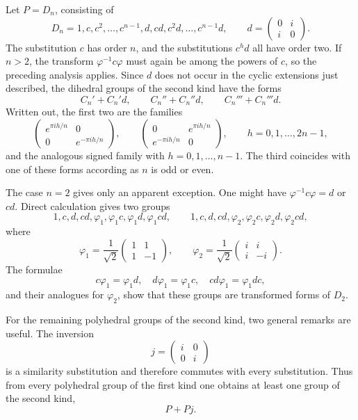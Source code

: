 \documentclass[11pt,a4paper]{book}
\begin{document}
Let \(P=D_n\), consisting of
\begin{equation}\label{eq:62-8d}
 D_n=1,c,c^2,\ldots,c^{n-1},d,cd,c^2d,\ldots,c^{n-1}d,
 \qquad
 d=\begin{pmatrix}0&i\\i&0\end{pmatrix}.
\end{equation}
The substitution \(c\) has order \(n\), and the substitutions \(c^hd\) all have order two.  If \(n>2\), the transform \(\varphi^{-1}c\varphi\) must again be among the powers of \(c\), so the preceding analysis applies.  Since \(d\) does not occur in the cyclic extensions just described, the dihedral groups of the second kind have the forms
\begin{equation}\label{eq:62-9}
 C_n'+C_n'd,
 \qquad
 C_n''+C_n''d,
 \qquad
 C_n'''+C_n'''d.
\end{equation}
Written out, the first two are the families
\[
 \begin{pmatrix}e^{\pi ih/n}&0\\0&e^{-\pi ih/n}\end{pmatrix},
 \qquad
 \begin{pmatrix}0&e^{\pi ih/n}\\e^{-\pi ih/n}&0\end{pmatrix},
 \qquad h=0,1,\ldots,2n-1,
\]
and the analogous signed family with \(h=0,1,\ldots,n-1\).  The third coincides with one of these forms according as \(n\) is odd or even.

The case \(n=2\) gives only an apparent exception.  One might have \(\varphi^{-1}c\varphi=d\) or \(cd\).  Direct calculation gives two groups
\begin{equation}\label{eq:62-11}
 1,c,d,cd,\varphi_1,\varphi_1c,\varphi_1d,\varphi_1cd,
 \qquad
 1,c,d,cd,\varphi_2,\varphi_2c,\varphi_2d,\varphi_2cd,
\end{equation}
where
\[
 \varphi_1=\frac1{\sqrt2}\begin{pmatrix}1&1\\1&-1\end{pmatrix},
 \qquad
 \varphi_2=\frac1{\sqrt2}\begin{pmatrix}i&i\\i&-i\end{pmatrix}.
\]
The formulae
\[
 c\varphi_1=\varphi_1d,
 \quad d\varphi_1=\varphi_1c,
 \quad cd\varphi_1=\varphi_1dc,
\]
and their analogues for \(\varphi_2\), show that these groups are transformed forms of \(D_2\).

For the remaining polyhedral groups of the second kind, two general remarks are useful.  The inversion
\begin{equation}\label{eq:62-inversion}
 j=\begin{pmatrix}i&0\\0&i\end{pmatrix}
\end{equation}
is a similarity substitution and therefore commutes with every substitution.  Thus from every polyhedral group of the first kind one obtains at least one group of the second kind,
\begin{equation}\label{eq:62-12}
 P+Pj.
\end{equation}
\end{document}
